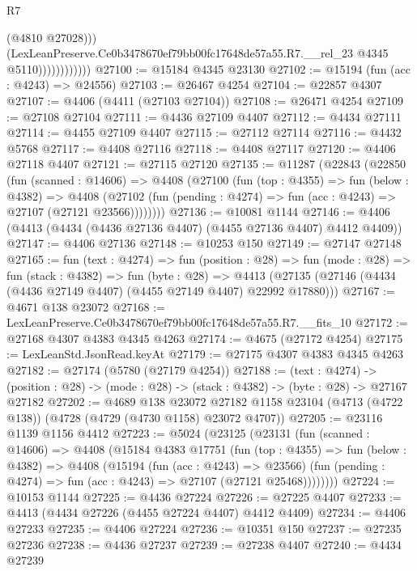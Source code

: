 \begin{lexlean}{R7}
\begin{coremodule}
                              (@4810 @27028)))
                          (LexLeanPreserve.Ce0b3478670ef79bb00fc17648de57a55.R7.__rel_23
                            @4345
                            @5110))))))))))))
@27100 := @15184 @4345 @23130
@27102 := @15194 (fun (acc : @4243) => @24556)
@27103 := @26467 @4254
@27104 := @22857 @4307
@27107 := @4406 (@4411 (@27103 @27104))
@27108 := @26471 @4254
@27109 := @27108 @27104
@27111 := @4436 @27109 @4407
@27112 := @4434 @27111
@27114 := @4455 @27109 @4407
@27115 := @27112 @27114
@27116 := @4432 @5768
@27117 := @4408 @27116
@27118 := @4408 @27117
@27120 := @4406 @27118 @4407
@27121 := @27115 @27120
@27135 := @11287
    (@22843
      (@22850
        (fun (scanned : @14606) =>
        @4408
          (@27100
            (fun (top : @4355) =>
            fun (below : @4382) =>
            @4408
              (@27102 (fun (pending : @4274) => fun (acc : @4243) => @27107 (@27121 @23566))))))))
@27136 := @10081 @1144
@27146 := @4406 (@4413 (@4434 (@4436 @27136 @4407) (@4455 @27136 @4407) @4412 @4409))
@27147 := @4406 @27136
@27148 := @10253 @150
@27149 := @27147 @27148
@27165 := fun (text : @4274) =>
  fun (position : @28) =>
  fun (mode : @28) =>
  fun (stack : @4382) =>
  fun (byte : @28) =>
  @4413 (@27135 (@27146 (@4434 (@4436 @27149 @4407) (@4455 @27149 @4407) @22992 @17880)))
@27167 := @4671 @138 @23072
@27168 := LexLeanPreserve.Ce0b3478670ef79bb00fc17648de57a55.R7.__fits_10
@27172 := @27168 @4307 @4383 @4345 @4263
@27174 := @4675 (@27172 @4254)
@27175 := LexLeanStd.JsonRead.keyAt
@27179 := @27175 @4307 @4383 @4345 @4263
@27182 := @27174 (@5780 (@27179 @4254))
@27188 := (text : @4274) ->
  (position : @28) -> (mode : @28) -> (stack : @4382) -> (byte : @28) -> @27167 @27182
@27202 := @4689
    @138
    @23072
    @27182
    @1158
    @23104
    (@4713 (@4722 @138))
    (@4728 (@4729 (@4730 @1158) @23072 @4707))
@27205 := @23116 @1139 @1156 @4412
@27223 := @5024
    (@23125
      (@23131
        (fun (scanned : @14606) =>
        @4408
          (@15184
            @4383
            @17751
            (fun (top : @4355) =>
            fun (below : @4382) =>
            @4408
              (@15194
                (fun (acc : @4243) => @23566)
                (fun (pending : @4274) => fun (acc : @4243) => @27107 (@27121 @25468))))))))
@27224 := @10153 @1144
@27225 := @4436 @27224
@27226 := @27225 @4407
@27233 := @4413 (@4434 @27226 (@4455 @27224 @4407) @4412 @4409)
@27234 := @4406 @27233
@27235 := @4406 @27224
@27236 := @10351 @150
@27237 := @27235 @27236
@27238 := @4436 @27237
@27239 := @27238 @4407
@27240 := @4434 @27239

\end{coremodule}
\end{lexlean}
